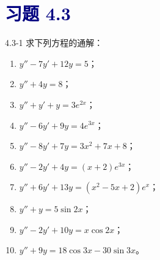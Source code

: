 \documentclass[UTF8,a4paper,11pt]{ctexart}
\newcommand{\sect}[1]{\section*{\textcolor{navy}{习题 #1}}}
\begin{document}
\sect{4.3}
\begin{problem}{4.3-1}
求下列方程的通解：
  \begin{enumerate}[label=(\arabic*)]
    \item $y''-7y'+12y=5$；
    \item $y''+4y=8$；
    \item $y''+y'+y=3e^{2x}$；
    \item $y''-6y'+9y=4e^{3x}$；
    \item $y''-8y'+7y=3x^2+7x+8$；
    \item $y''-2y'+4y=(x+2)e^{3x}$；
    \item $y''+6y'+13y=(x^2-5x+2)e^x$；
    \item $y''+y=5\sin 2x$；
    \item $y''-2y'+10y=x\cos 2x$；
    \item $y''+9y=18\cos 3x-30\sin 3x$。
  \end{enumerate}
\end{problem}
\end{document}
